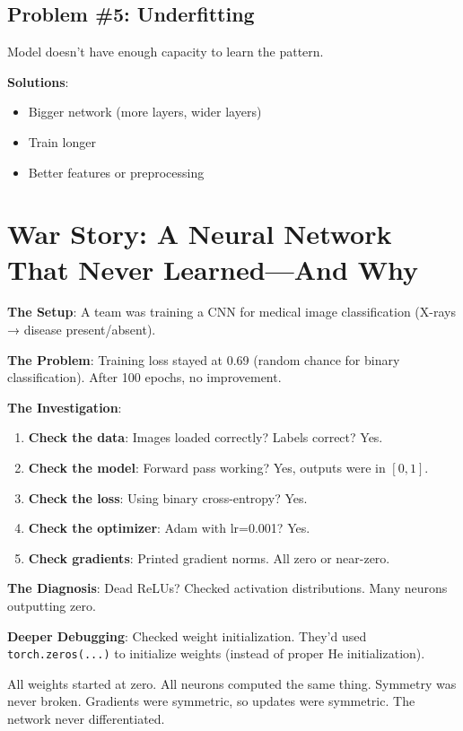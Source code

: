 \documentclass[11pt,oneside]{book}
\begin{document}
\subsection{Problem \#5: Underfitting}

Model doesn't have enough capacity to learn the pattern.

\textbf{Solutions}:
\begin{itemize}
\item Bigger network (more layers, wider layers)
\item Train longer
\item Better features or preprocessing
\end{itemize}

\section{War Story: A Neural Network That Never Learned---And Why}

\textbf{The Setup}: A team was training a CNN for medical image classification (X-rays → disease present/absent).

\textbf{The Problem}: Training loss stayed at 0.69 (random chance for binary classification). After 100 epochs, no improvement.

\textbf{The Investigation}:

\begin{enumerate}
\item \textbf{Check the data}: Images loaded correctly? Labels correct? Yes.
\item \textbf{Check the model}: Forward pass working? Yes, outputs were in $[0, 1]$.
\item \textbf{Check the loss}: Using binary cross-entropy? Yes.
\item \textbf{Check the optimizer}: Adam with lr=0.001? Yes.
\item \textbf{Check gradients}: Printed gradient norms. All zero or near-zero.
\end{enumerate}

\textbf{The Diagnosis}: Dead ReLUs? Checked activation distributions. Many neurons outputting zero.

\textbf{Deeper Debugging}: Checked weight initialization. They'd used \texttt{torch.zeros(...)} to initialize weights (instead of proper He initialization).

All weights started at zero. All neurons computed the same thing. Symmetry was never broken. Gradients were symmetric, so updates were symmetric. The network never differentiated.
\end{document}
